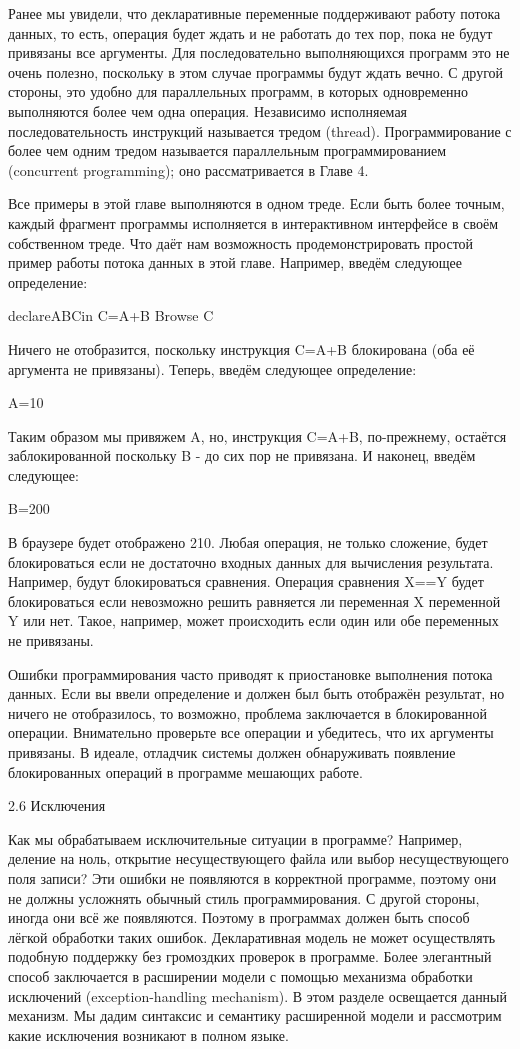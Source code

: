 Ранее мы увидели, что декларативные переменные поддерживают работу потока данных, то есть, операция будет ждать и не работать до тех пор, пока не будут привязаны все аргументы. Для последовательно выполняющихся программ это не очень полезно, поскольку в этом случае программы будут ждать вечно. С другой стороны, это удобно для параллельных программ, в которых одновременно выполняются более чем одна операция. Независимо исполняемая последовательность инструкций называется тредом (thread). Программирование с более чем одним тредом называется параллельным программированием (concurrent programming); оно рассматривается в Главе 4.

Все примеры в этой главе выполняются в одном треде. Если быть более точным, каждый фрагмент программы исполняется в интерактивном интерфейсе в своём собственном треде. Что даёт нам возможность продемонстрировать простой пример работы потока данных в этой главе. Например, введём следующее определение:

declareABCin
C=A+B
{Browse C}

Ничего не отобразится, поскольку инструкция C=A+B блокирована (оба её аргумента не привязаны). Теперь, введём следующее определение:

A=10

Таким образом мы привяжем A, но, инструкция C=A+B, по-прежнему, остаётся заблокированной поскольку B - до сих пор не привязана. И наконец, введём следующее:

B=200

В браузере будет отображено 210. Любая операция, не только сложение, будет блокироваться если не достаточно входных данных для вычисления результата. Например, будут блокироваться сравнения. Операция сравнения X==Y будет блокироваться если невозможно решить равняется ли переменная X переменной Y или нет. Такое, например, может происходить если один или обе переменных не привязаны.

Ошибки программирования часто приводят к приостановке выполнения потока данных. Если вы ввели определение и должен был быть отображён результат, но ничего не отобразилось, то возможно, проблема заключается в блокированной операции. Внимательно проверьте все операции и убедитесь, что их аргументы привязаны. В идеале, отладчик системы должен обнаруживать появление блокированных операций в программе мешающих работе.

2.6 Исключения

Как мы обрабатываем исключительные ситуации в программе? Например, деление на ноль, открытие несуществующего файла или выбор несуществующего поля записи? Эти ошибки не появляются в корректной программе, поэтому они не должны усложнять обычный стиль программирования. С другой стороны, иногда они всё же появляются. Поэтому в программах должен быть способ лёгкой обработки таких ошибок. Декларативная модель не может осуществлять подобную поддержку без громоздких проверок в программе. Более элегантный способ заключается в расширении модели с помощью механизма обработки исключений (exception-handling mechanism). В этом разделе освещается данный механизм. Мы дадим синтаксис и семантику расширенной модели и рассмотрим какие исключения возникают в полном языке.

